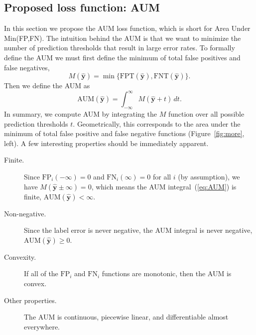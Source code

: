 \documentclass{article}
\begin{document}
\subsection{Proposed loss function: AUM}

In this section we propose the AUM loss function, which is short for Area Under Min(FP,FN).
The intuition behind the AUM is that we want to minimize the number of prediction thresholds that result in large error rates.
To formally define the AUM we must first define the minimum of total false positives and false negatives, 
\begin{equation}
    M(\mathbf {\hat y}) = 
    \min\{
    \text{FPT}(\mathbf{\hat y}),
    \text{FNT}(\mathbf{\hat y})
    \}.
\end{equation}
Then we define the AUM as 
\begin{equation}
\label{eq:AUM}
    \text{AUM}(\mathbf {\hat y}) =
    \int_{-\infty}^{\infty}
    M(\mathbf {\hat y} + t)\, dt.
\end{equation}
In summary, we compute AUM by integrating the $M$ function over all possible prediction thresholds $t$.
Geometrically, this corresponds to the area under the minimum of total false positive and false negative functions (Figure~\ref{fig:more}, left).
A few interesting properties should be immediately apparent.
\begin{description}
    \item[Finite.] 
Since $\text{FP}_i(-\infty)=0$ and $\text{FN}_i(\infty)=0$ for all $i$ (by assumption), we have $M(\mathbf{\hat y}\pm\infty)=0$, which means 
the AUM integral~(\ref{eq:AUM}) is finite, $\text{AUM}(\mathbf{\hat y})<\infty$.
\item[Non-negative.] Since the label error is never negative, the AUM integral is never negative, $\text{AUM}(\mathbf{\hat y})\geq 0$.
\item[Convexity.] If all of the $\text{FP}_i$ and $\text{FN}_i$ functions are monotonic, then the AUM is convex.
\item[Other properties.] The AUM is continuous, piecewise linear, and differentiable almost everywhere. 
\end{description}
\end{document}
